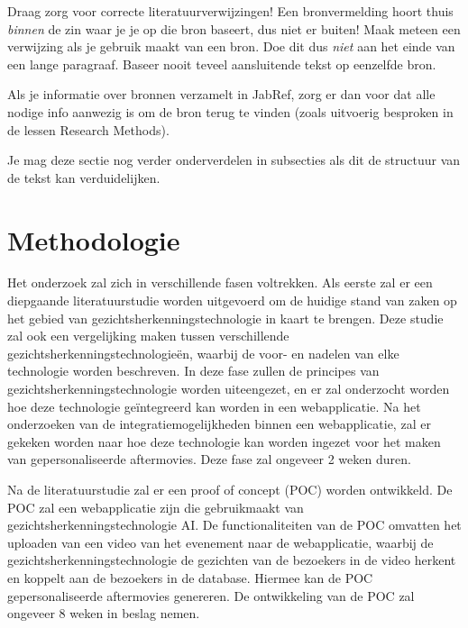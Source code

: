 Draag zorg voor correcte literatuurverwijzingen! Een bronvermelding hoort thuis \emph{binnen} de zin waar je je op die bron baseert, dus niet er buiten! Maak meteen een verwijzing als je gebruik maakt van een bron. Doe dit dus \emph{niet} aan het einde van een lange paragraaf. Baseer nooit teveel aansluitende tekst op eenzelfde bron.

Als je informatie over bronnen verzamelt in JabRef, zorg er dan voor dat alle nodige info aanwezig is om de bron terug te vinden (zoals uitvoerig besproken in de lessen Research Methods).


Je mag deze sectie nog verder onderverdelen in subsecties als dit de structuur van de tekst kan verduidelijken.

\section{Methodologie}%
\label{sec:methodologie}

Het onderzoek zal zich in verschillende fasen voltrekken.
Als eerste zal er een diepgaande literatuurstudie worden uitgevoerd om de huidige stand van zaken op het gebied van gezichtsherkenningstechnologie in kaart te brengen.
Deze studie zal ook een vergelijking maken tussen verschillende gezichtsherkenningstechnologieën, waarbij de voor- en nadelen van elke technologie worden beschreven.
In deze fase zullen de principes van gezichtsherkenningstechnologie worden uiteengezet,
en er zal onderzocht worden hoe deze technologie geïntegreerd kan worden in een webapplicatie.
Na het onderzoeken van de integratiemogelijkheden binnen een webapplicatie,
zal er gekeken worden naar hoe deze technologie kan worden ingezet voor het maken van gepersonaliseerde aftermovies. Deze fase zal ongeveer 2 weken duren.

Na de literatuurstudie zal er een proof of concept (POC) worden ontwikkeld.
De POC zal een webapplicatie zijn die gebruikmaakt van gezichtsherkenningstechnologie AI.
De functionaliteiten van de POC omvatten het uploaden van een video van het evenement naar de webapplicatie,
waarbij de gezichtsherkenningstechnologie de gezichten van de bezoekers in de video herkent en koppelt aan de bezoekers in de database.
Hiermee kan de POC gepersonaliseerde aftermovies genereren. De ontwikkeling van de POC zal ongeveer 8 weken in beslag nemen.

